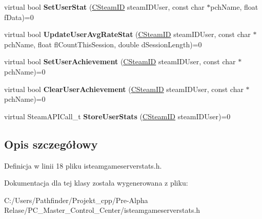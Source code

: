 \begin{DoxyCompactItemize}
virtual bool {\bfseries Set\+User\+Stat} (\hyperlink{class_c_steam_i_d}{C\+Steam\+ID} steam\+I\+D\+User, const char $\ast$pch\+Name, float f\+Data)=0
\item 
\mbox{\label{class_i_steam_game_server_stats_abdbe8f8783865658704edabcf49605c3}} 
virtual bool {\bfseries Update\+User\+Avg\+Rate\+Stat} (\hyperlink{class_c_steam_i_d}{C\+Steam\+ID} steam\+I\+D\+User, const char $\ast$pch\+Name, float fl\+Count\+This\+Session, double d\+Session\+Length)=0
\item 
\mbox{\label{class_i_steam_game_server_stats_a85767d40b80228574e72fb6986a717ad}} 
virtual bool {\bfseries Set\+User\+Achievement} (\hyperlink{class_c_steam_i_d}{C\+Steam\+ID} steam\+I\+D\+User, const char $\ast$pch\+Name)=0
\item 
\mbox{\label{class_i_steam_game_server_stats_ad6164382a507d9d48ddeb3ff28c11af0}} 
virtual bool {\bfseries Clear\+User\+Achievement} (\hyperlink{class_c_steam_i_d}{C\+Steam\+ID} steam\+I\+D\+User, const char $\ast$pch\+Name)=0
\item 
\mbox{\label{class_i_steam_game_server_stats_a9a2df5cf35138faf5c32cef561df93df}} 
virtual Steam\+A\+P\+I\+Call\+\_\+t {\bfseries Store\+User\+Stats} (\hyperlink{class_c_steam_i_d}{C\+Steam\+ID} steam\+I\+D\+User)=0
\end{DoxyCompactItemize}


\subsection{Opis szczegółowy}


Definicja w linii 18 pliku isteamgameserverstats.\+h.



Dokumentacja dla tej klasy została wygenerowana z pliku\+:\begin{DoxyCompactItemize}
\item 
C\+:/\+Users/\+Pathfinder/\+Projekt\+\_\+cpp/\+Pre-\/\+Alpha Relase/\+P\+C\+\_\+\+Master\+\_\+\+Control\+\_\+\+Center/isteamgameserverstats.\+h\end{DoxyCompactItemize}
